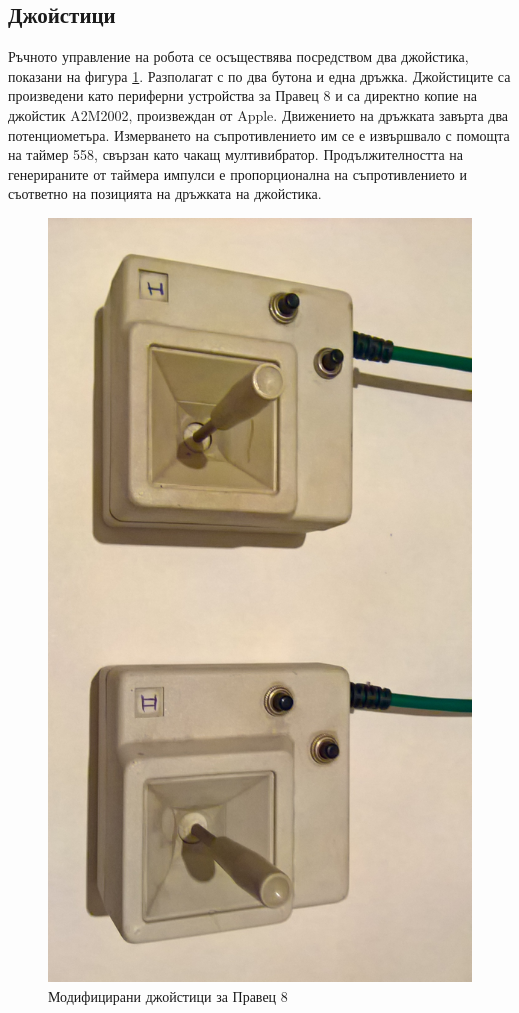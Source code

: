 \subsection{Джойстици}
\label{joysticks}
Ръчното управление на робота се осъществява посредством два джойстика, показани на фигура \ref{fig:joysticks}. Разполагат с по два бутона и една дръжка. Джойстиците са произведени като периферни устройства за Правец 8\cite{joystick_pravets} и са директно копие на джойстик A2M2002, произвеждан от Apple.\cite{joystick_apple} Движението на дръжката завърта два потенциометъра. Измерването на съпротивлението им се е извършвало с помощта на таймер 558, свързан като чакащ мултивибратор. Продължителността на генерираните от таймера импулси е пропорционална на съпротивлението и съответно на позицията на дръжката на джойстика.
\cite{joystick_explained}\\
\indent{}
\begin{figure}[!htb]
    \centering
    \includegraphics[width=\linewidth]{pictures/joysticks.jpg}
    \caption{Модифицирани джойстици за Правец 8}
    \label{fig:joysticks}
\end{figure}
